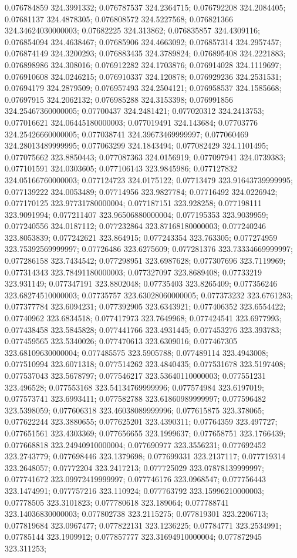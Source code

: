 0.076784859 324.3991332; 0.076787537 324.2364715; 0.076792208 324.2084405; 0.07681137 324.4878305; 0.076808572 324.5227568; 0.076821366 324.34624030000003; 0.07682225 324.313862; 0.076835857 324.4309116; 0.076854094 324.4638467; 0.07685906 324.4663092; 0.076857314 324.2957457; 0.076874149 324.3200293; 0.076883435 324.3789824; 0.076895408 324.2221883; 0.076898986 324.308016; 0.076912282 324.1703876; 0.076914028 324.1119697; 0.076910608 324.0246215; 0.076910337 324.120878; 0.076929236 324.2531531; 0.07694179 324.2879509; 0.076957493 324.2504121; 0.076958537 324.1585668; 0.07697915 324.2062132; 0.076985288 324.3153398; 0.076991856 324.25467360000005; 0.07700437 324.2481421; 0.077020312 324.2413753; 0.077016621 324.06445180000003; 0.077019491 324.143684; 0.07703776 324.25426660000005; 0.077038741 324.39673469999997; 0.077060469 324.28013489999995; 0.077063299 324.1843494; 0.077082429 324.1101495; 0.077075662 323.8850443; 0.077087363 324.0156919; 0.077097941 324.0739383; 0.077101591 324.0303605; 0.077106143 323.9845986; 0.077127832 324.05166760000003; 0.077124723 324.0175122; 0.07713479 323.91643739999995; 0.077139222 324.0053489; 0.07714956 323.9827784; 0.07716492 324.0226942; 0.077170125 323.97731780000004; 0.077187151 323.928258; 0.077198111 323.9091994; 0.077211407 323.96506880000004; 0.077195353 323.9039959; 0.077240556 324.0187112; 0.077232864 323.87168180000003; 0.077240246 323.8053839; 0.077242621 323.864915; 0.077243354 323.763305; 0.077274959 323.75392569999997; 0.07726486 323.6275609; 0.077281376 323.73334669999997; 0.077286158 323.7434542; 0.077298951 323.6987628; 0.077307696 323.7119969; 0.077314343 323.78491180000003; 0.077327097 323.8689408; 0.07733219 323.931149; 0.077347191 323.8802048; 0.07735403 323.8265409; 0.077356246 323.68274510000003; 0.07735757 323.63028060000005; 0.077373232 323.6761283; 0.077377784 323.6094231; 0.077392905 323.6343921; 0.077406352 323.6554422; 0.07740962 323.6834518; 0.077417973 323.7649968; 0.077424541 323.6977993; 0.077438458 323.5845828; 0.077441766 323.4931445; 0.077453276 323.393783; 0.077459565 323.5340026; 0.077470613 323.6309016; 0.077467305 323.68109630000004; 0.077485575 323.5905788; 0.077489114 323.4943008; 0.077510994 323.6071318; 0.077514262 323.4840435; 0.077531678 323.5197408; 0.077537043 323.5678797; 0.077546217 323.53640110000003; 0.077551231 323.496528; 0.077553168 323.54134769999996; 0.077574984 323.6197019; 0.077573741 323.6993411; 0.077582788 323.61860989999997; 0.077596482 323.5398059; 0.077606318 323.46038089999996; 0.077615875 323.378065; 0.077622244 323.3880655; 0.077625201 323.4390311; 0.07764359 323.497727; 0.077651561 323.4303369; 0.077656655 323.1999637; 0.077658751 323.1766439; 0.077668818 323.24940910000004; 0.077690977 323.3556231; 0.077692452 323.2743779; 0.077698446 323.1379698; 0.077699331 323.2137117; 0.077719314 323.2648057; 0.07772204 323.2417213; 0.077725029 323.07878139999997; 0.077741672 323.09972419999997; 0.077746176 323.0968547; 0.077756443 323.1474991; 0.077757216 323.110924; 0.077763792 323.15996210000003; 0.07778505 323.3101823; 0.077780618 323.189064; 0.077788741 323.14036830000003; 0.077802738 323.2115275; 0.077819301 323.2206713; 0.077819684 323.0967477; 0.077822131 323.1236225; 0.07784771 323.2534991; 0.07785144 323.1909912; 0.077857777 323.31694910000004; 0.077872945 323.311253; 